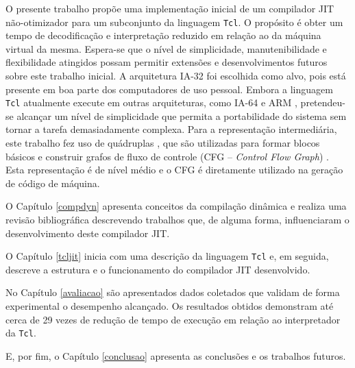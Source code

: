 O presente trabalho propõe uma implementação inicial de um compilador
JIT não-otimizador para um subconjunto da linguagem \texttt{Tcl}. O
propósito é obter um tempo de decodificação e interpretação
reduzido em relação ao da máquina virtual da mesma. Espera-se que o nível de
simplicidade, manutenibilidade e flexibilidade atingidos possam
permitir extensões e desenvolvimentos futuros sobre este trabalho inicial.
A arquitetura IA-32 \cite{intel_basicarch} foi escolhida como alvo,
pois está presente em boa
parte dos computadores de uso pessoal. Embora a linguagem \texttt{Tcl}
atualmente execute em outras arquiteturas, como IA-64
\cite{intel_basicarch} e ARM \cite{arm_arch}, pretendeu-se alcançar um
nível de simplicidade que permita a portabilidade do sistema sem
tornar a tarefa demasiadamente complexa. Para a representação
intermediária, este trabalho fez uso de
quádruplas \cite{muchnick}, que são utilizadas para formar
blocos básicos e
construir grafos de fluxo de controle (CFG -- \textit{Control Flow
  Graph}) .
Esta representação é de nível médio e
o CFG é diretamente utilizado na geração de código de máquina.

O Capítulo \ref{compdyn} apresenta conceitos da compilação dinâmica e
realiza uma revisão bibliográfica descrevendo trabalhos que, de alguma
forma, influenciaram o desenvolvimento deste compilador JIT.

O Capítulo \ref{tcljit} inicia com uma descrição da linguagem
\texttt{Tcl} e, em seguida, descreve a estrutura e o funcionamento do
compilador JIT desenvolvido.

No Capítulo \ref{avaliacao} são apresentados dados coletados que
validam de forma experimental o desempenho alcançado. Os resultados
obtidos demonstram até cerca de 29 vezes de redução de tempo de
execução em relação ao interpretador da \texttt{Tcl}.

E, por fim, o Capítulo \ref{conclusao} apresenta as conclusões e os
trabalhos futuros.
